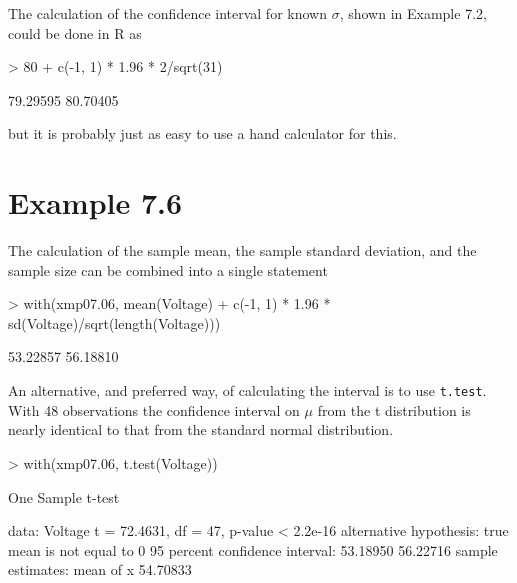 \documentclass{book}
\begin{document}
The calculation of the confidence interval for known $\sigma$, shown in
Example 7.2, could be done in R as
\begin{Schunk}
\begin{Sinput}
> 80 + c(-1, 1) * 1.96 * 2/sqrt(31)
\end{Sinput}
\begin{Soutput}
[1] 79.29595 80.70405
\end{Soutput}
\end{Schunk}
but it is probably just as easy to use a hand calculator for this.


\section{Example 7.6}
\label{sec:xmp07.06}

The calculation of the sample mean, the sample standard deviation, and
the sample size can be combined into a single statement
\begin{Schunk}
\begin{Sinput}
> with(xmp07.06, mean(Voltage) + c(-1, 1) * 1.96 * sd(Voltage)/sqrt(length(Voltage)))
\end{Sinput}
\begin{Soutput}
[1] 53.22857 56.18810
\end{Soutput}
\end{Schunk}
An alternative, and preferred way, of calculating the interval is to
use \texttt{t.test}.  With 48 observations the confidence interval on
$\mu$ from the t distribution is nearly identical to that from the
standard normal distribution.
\begin{Schunk}
\begin{Sinput}
> with(xmp07.06, t.test(Voltage))
\end{Sinput}
\begin{Soutput}
	One Sample t-test

data:  Voltage 
t = 72.4631, df = 47, p-value < 2.2e-16
alternative hypothesis: true mean is not equal to 0 
95 percent confidence interval:
 53.18950 56.22716 
sample estimates:
mean of x 
 54.70833 
\end{Soutput}
\end{Schunk}
\end{document}
